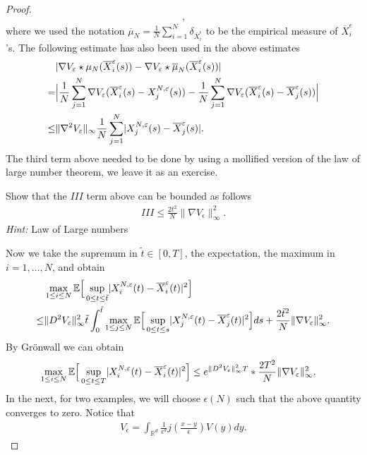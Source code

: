 \begin{proof}
\begin{align*}
,\end{align*}
where we used the notation $\overline{\mu}_N=\frac{1}{N} \sum_{i=1}^{N}   \delta_{\overline{X}_i^{\epsilon}  }$ to be the empirical measure of $\overline{X}^\epsilon_i$'s.
The following estimate has also been used in the above estimates
\begin{align*}
&\lvert\nabla V_\varepsilon \star  \mu_N(\overline{X}_i^{\varepsilon}(s)) - \nabla V_{\varepsilon} \star  \overline{\mu }_N(\overline{X}_i^{\varepsilon}(s)  ) \rvert\\
 = &\Big|\frac{1}{N}\sum_{j=1}^{N} \nabla V_\varepsilon(\overline{X}_i^{\varepsilon}(s) - X_j^{N,\varepsilon}(s)   )  - \frac{1}{N}\sum_{j=1}^{N} \nabla V_{\varepsilon}(\overline{X}_i^{\varepsilon}(s)-\overline{X}_j^{\varepsilon}(s)    ) \Big|\\
\leq & \|\nabla ^2 V_\varepsilon\|_{\infty} \frac{1}{N} \sum_{j=1}^{N} \lvert X_j^{N,\varepsilon}(s) - \overline{X}^{\varepsilon}_j(s)   \rvert
.\end{align*}
The third term above needed to be done by using a mollified version of the law of large number theorem, we leave it as an exercise.
\begin{exercise}
 Show that the $III$ term above can be bounded as follows
 \begin{align*}
  III \le  \frac{2t^2}{N}\|\nabla V_\epsilon\|_{\infty}^2
 .\end{align*}
\textit{Hint:} Law of Large numbers
\end{exercise}

\vskip5mm
Now we take the supremum in $\tilde t\in [0,T]$, the expectation, the maximum in $i=1,\ldots,N$, and obtain 
\begin{align*}
  &\max_{1 \le i \le N}\mathbb{E}\Big[\sup_{0\leq t\leq \tilde t}\lvert X_i^{N,\varepsilon}(t) - \overline{X}_{i}^{\varepsilon}(t)\rvert^2  \Big]\\
  \le & \|D^2 V_{\varepsilon}\|_{\infty}^2 \tilde t \int_0^{\tilde t}  \max_{1\le j\le N} \mathbb{E}\Big[\sup_{0\leq t\leq s}\lvert X_j^{N,\varepsilon}(t) - \overline{X}_j^{\varepsilon}(t)  \rvert^2\Big] ds + \frac{2\tilde t^2}{N}\|\nabla V_\varepsilon\|_{\infty}^2
.\end{align*}
By Grönwall we can obtain 
\begin{align}\label{sss}
  \max_{1 \le i \le N}\mathbb{E}\Big[\sup_{0\leq t\leq T}\lvert X_i^{N,\varepsilon}(t) - \overline{X}_{i}^{\varepsilon}(t)\rvert^2 \Big ] &\le e^{\|D^2 V_{\varepsilon}\|_{\infty}^2 T} *\frac{2T^2}{N}\|\nabla V_\varepsilon\|^2_{\infty}
.\end{align}
In the next, for two examples, we will choose $\epsilon(N)$ such that the above quantity converges to zero. Notice that
\begin{align*}
  V_\epsilon = \int_{\mathbb{R}^{d} }\frac{1}{\epsilon^d}j(\frac{x-y}{\epsilon})V(y) dy
.\end{align*}


\end{proof}
